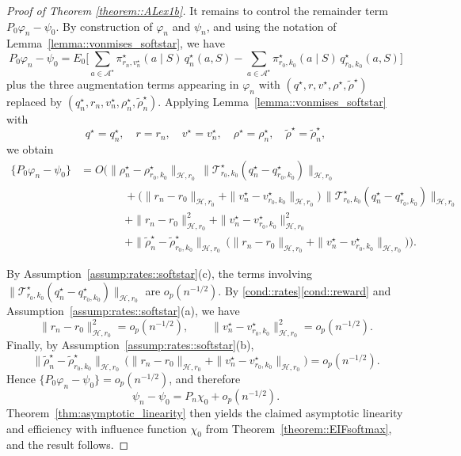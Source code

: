 \documentclass[11pt]{article}
\theoremstyle{plain}
\begin{document}
\begin{proof}[Proof of Theorem \ref{theorem::ALex1b}]
It remains to control the remainder term $P_0 \varphi_n - \psi_0$.  
By construction of $\varphi_n$ and $\psi_n$, and using the notation of Lemma~\ref{lemma::vonmises_softstar}, we have
\[
P_0 \varphi_n - \psi_0
=
E_0\!\Big[
    \sum_{a \in \mathcal{A}^\star} 
        \pi_{r_n,v_n^\star}^\star(a \mid S)\,q_n^\star(a,S) 
        - 
        \sum_{a \in \mathcal{A}^\star} 
        \pi_{r_0,k_0}^\star(a \mid S)\,q_{r_0,k_0}^\star(a,S)
\Big]
\]
plus the three augmentation terms appearing in $\varphi_n$ with $(q^\star,r,v^\star,\rho^\star,\widetilde{\rho}^\star)$ replaced by $(q_n^\star,r_n,v_n^\star,\rho_n^\star,\widetilde{\rho}_n^\star)$.  
Applying Lemma~\ref{lemma::vonmises_softstar} with
\[
q^\star = q_n^\star,\quad
r = r_n,\quad
v^\star = v_n^\star,\quad
\rho^\star = \rho_n^\star,\quad
\widetilde{\rho}^\star = \widetilde{\rho}_n^\star,
\]
we obtain
\begin{align*}
\{P_0 \varphi_n - \psi_0\}
&= O\Big(
     \|\rho_n^\star - \rho_{r_0,k_0}^\star\|_{\mathcal{H},r_0}\,
     \bigl\|\mathcal{T}_{r_0,k_0}^\star(q_n^\star - q_{r_0,k_0}^\star)\bigr\|_{\mathcal{H},r_0} \\
&\qquad\qquad
     +\bigl(\|r_n-r_0\|_{\mathcal{H},r_0}
            +\|v_n^\star - v_{r_0,k_0}^\star\|_{\mathcal{H},r_0}\bigr)\,
      \bigl\|\mathcal{T}_{r_0,k_0}^\star(q_n^\star - q_{r_0,k_0}^\star)\bigr\|_{\mathcal{H},r_0} \\
&\qquad\qquad
     +\|r_n-r_0\|_{\mathcal{H},r_0}^{2}
     +\|v_n^\star - v_{r_0,k_0}^\star\|_{\mathcal{H},r_0}^{2} \\
&\qquad\qquad
     +\|\widetilde{\rho}_n^\star - \widetilde{\rho}_{r_0,k_0}^\star\|_{\mathcal{H},r_0}\,
      \bigl(\|r_n-r_0\|_{\mathcal{H},r_0}
            +\|v_n^\star - v_{r_0,k_0}^\star\|_{\mathcal{H},r_0}\bigr)
\Big).
\end{align*}

By Assumption~\ref{assump:rates::softstar}(c), the terms involving 
$\|\mathcal{T}_{r_0,k_0}^\star(q_n^\star - q_{r_0,k_0}^\star)\|_{\mathcal{H},r_0}$ are $o_p(n^{-1/2})$.  
By \ref{cond::rates}\ref{cond::reward} and 
Assumption~\ref{assump:rates::softstar}(a), we have
\[
\|r_n-r_0\|_{\mathcal{H},r_0}^{2} = o_p(n^{-1/2}),
\qquad
\|v_n^\star - v_{r_0,k_0}^\star\|_{\mathcal{H},r_0}^{2} = o_p(n^{-1/2}).
\]
Finally, by Assumption~\ref{assump:rates::softstar}(b),
\[
\|\widetilde{\rho}_n^\star - \widetilde{\rho}_{r_0,k_0}^\star\|_{\mathcal{H},r_0}\,
\bigl(\|r_n-r_0\|_{\mathcal{H},r_0}
      +\|v_n^\star - v_{r_0,k_0}^\star\|_{\mathcal{H},r_0}\bigr)
= o_p(n^{-1/2}).
\]
Hence $\{P_0 \varphi_n - \psi_0\} = o_p(n^{-1/2})$, and therefore
\[
\psi_n - \psi_0
= P_n \chi_0 + o_p(n^{-1/2}).
\]
Theorem~\ref{thm:asymptotic_linearity} then yields the claimed asymptotic linearity and efficiency with influence function $\chi_0$ from Theorem~\ref{theorem::EIFsoftmax}, and the result follows.
\end{proof}
\end{document}
